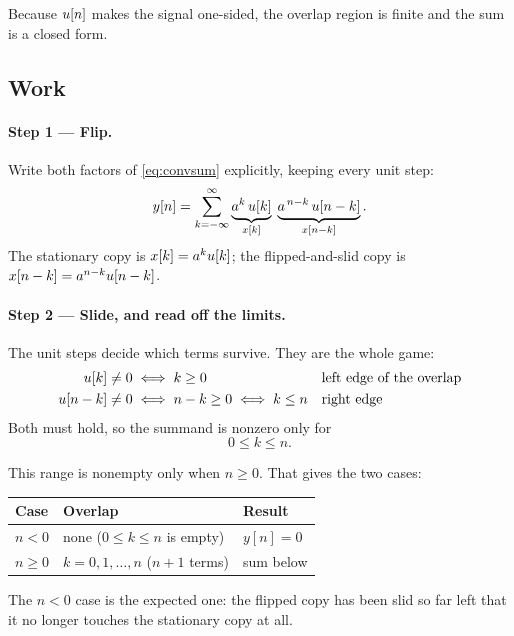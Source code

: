 Because $u[n]$ makes the signal one-sided, the overlap region is finite and
the sum is a closed form.

\subsection*{Work}

\paragraph{Step 1 --- Flip.}
Write both factors of \eqref{eq:convsum} explicitly, keeping every unit step:
\begin{equation}
  y[n] = \sum_{k=-\infty}^{\infty}
         \underbrace{a^{k}\,u[k]}_{x[k]} \;
         \underbrace{a^{\,n-k}\,u[n-k]}_{x[n-k]} .
  \label{eq:expanded}
\end{equation}
The stationary copy is $x[k] = a^ku[k]$; the flipped-and-slid copy is
$x[n-k] = a^{n-k}u[n-k]$.

\paragraph{Step 2 --- Slide, and read off the limits.}
The unit steps decide which terms survive. They are the whole game:
\begin{align}
  u[k]   &\ne 0 \iff k \ge 0    && \text{left edge of the overlap} \\
  u[n-k] &\ne 0 \iff n - k \ge 0 \iff k \le n && \text{right edge}
\end{align}
Both must hold, so the summand is nonzero only for
\begin{equation}
  0 \le k \le n.
\end{equation}

This range is nonempty only when $n \ge 0$. That gives the two cases:

\begin{center}
\begin{tabular}{lll}
  \toprule
  Case & Overlap & Result \\
  \midrule
  $n < 0$   & none ($0 \le k \le n$ is empty) & $y[n] = 0$ \\
  $n \ge 0$ & $k = 0, 1, \ldots, n$ \quad($n+1$ terms) & sum below \\
  \bottomrule
\end{tabular}
\end{center}

The $n < 0$ case is the expected one: the flipped copy has been slid so far left
that it no longer touches the stationary copy at all.

